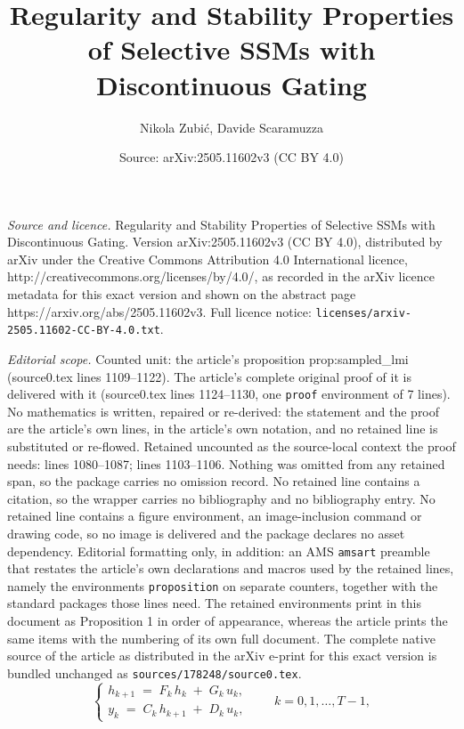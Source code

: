 \documentclass[10pt,a4paper]{amsart}
\title{Regularity and Stability Properties of Selective SSMs with Discontinuous Gating}
\author{Nikola Zubi\'c, Davide Scaramuzza}
\date{Source: arXiv:2505.11602v3 (CC BY 4.0)}
\begin{document}
\maketitle

\noindent\emph{Source and licence.} Regularity and Stability Properties of Selective SSMs with Discontinuous Gating. Version arXiv:2505.11602v3 (CC BY 4.0), distributed by arXiv under the Creative Commons Attribution 4.0 International licence, http://creativecommons.org/licenses/by/4.0/, as recorded in the arXiv licence metadata for this exact version and shown on the abstract page https://arxiv.org/abs/2505.11602v3. Full licence notice: \texttt{licenses/arxiv-2505.11602-CC-BY-4.0.txt}.\par\smallskip

\noindent\textit{Editorial scope.} Counted unit: the article's proposition prop:sampled\_lmi (source0.tex lines 1109--1122). The article's complete original proof of it is delivered with it (source0.tex lines 1124--1130, one \texttt{proof} environment of 7 lines). No mathematics is written, repaired or re-derived: the statement and the proof are the article's own lines, in the article's own notation, and no retained line is substituted or re-flowed.  Retained uncounted as the source-local context the proof needs: lines 1080--1087; lines 1103--1106.  Nothing was omitted from any retained span, so the package carries no omission record.  No retained line contains a citation, so the wrapper carries no bibliography and no bibliography entry.  No retained line contains a figure environment, an image-inclusion command or drawing code, so no image is delivered and the package declares no asset dependency.  Editorial formatting only, in addition: an AMS \texttt{amsart} preamble that restates the article's own declarations and macros used by the retained lines, namely the environments \texttt{proposition} on separate counters, together with the standard packages those lines need.  The retained environments print in this document as Proposition 1 in order of appearance, whereas the article prints the same items with the numbering of its own full document.  The complete native source of the article as distributed in the arXiv e-print for this exact version is bundled unchanged as \texttt{sources/178248/source0.tex}.
\begin{equation}
\label{eq:discrete_recurrence}
\begin{cases}
h_{k+1} \;=\; F_k\, h_k \;+\; G_k\, u_k,\\
y_k \;=\; C_k\, h_{k+1} \;+\; D_k\, u_k,
\end{cases}
\qquad k=0,1,\ldots,T-1,
\end{equation}
\end{document}
